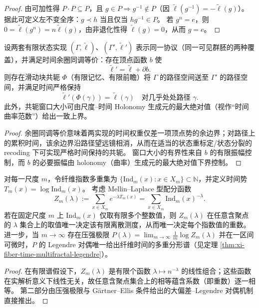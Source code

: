 \begin{proof}
由可加性得 \(P\cdot P\subseteq P\)，且 \(g\in P\Rightarrow g^{-1}\notin P\)（因 \(\widetilde{\ell}(g^{-1})=-\widetilde{\ell}(g)\)）。
据此可定义左不变全序：\(g\prec h\) 当且仅当 \(h g^{-1}\in P\)。
若 \(g^n=e\)，则 \(0=\widetilde{\ell}(g^n)=n\widetilde{\ell}(g)\)，由非退化性得 \(\widetilde{\ell}(g)=0\)，从而 \(g=e\)。
\end{proof}

\begin{theorem}\label{thm:xi-time-conjugacy-rigidity-bounded-class}
设两套有限状态实现 \((\Gamma,\widetilde{\ell})\)、\((\Gamma',\widetilde{\ell}')\) 表示同一协议（同一可见群胚的两种覆盖），并满足时间余圈同调等价：存在顶点函数 \(b\) 使
\[
\widetilde{\ell}'=\widetilde{\ell}+\partial b.
\]
则存在滑动块共轭 \(\Phi\)（有限记忆、有限前瞻）将 \(\Gamma\) 的路径空间送至 \(\Gamma'\) 的路径空间，并满足时间严格保持
\[
\widetilde{\ell}'(\Phi(\gamma))=\widetilde{\ell}(\gamma)
\quad\text{对几乎处处路径 \(\gamma\)}.
\]
此外，共轭窗口大小可由尺度--时间 Holonomy 生成元的最大绝对值（视作“时间曲率范数”）给出一致上界。
\end{theorem}

\begin{proof}
余圈同调等价意味着两实现的时间权重仅差一项顶点势的余边界；对路径上的累积时间，该余边界沿路径望远镜相消，从而在适当的状态重标定/状态分裂的 recoding 下可实现严格时间保持的共轭。
窗口大小的有界性来自 \(b\) 的有限振幅控制，而 \(b\) 的必要振幅由 holonomy（曲率）生成元的最大绝对值下界控制。
\end{proof}

\begin{proposition}\label{prop:xi-time-partition-identifiability-ind-multiset}
对每一尺度 \(m\)，令纤维指数多重集为 \(\{\mathrm{Ind}_m(x):x\in X_m\}\subset\mathbb N\)，并定义时间势 \(T_m(x)=\log \mathrm{Ind}_m(x)\)。
考虑 Mellin--Laplace 型配分函数
\[
Z_m(\lambda):=\sum_{x\in X_m} e^{-\lambda T_m(x)}=\sum_{x\in X_m}\mathrm{Ind}_m(x)^{-\lambda}.
\]
若在固定尺度 \(m\) 上 \(\mathrm{Ind}_m(x)\) 仅取有限多个整数值，则 \(Z_m(\lambda)\) 在任意含聚点的 \(\lambda\) 集合上的取值唯一决定该有限离散测度，从而唯一决定每个指数值的重数。
进一步，当 \(m\to\infty\) 存在压强极限
\(
P(\lambda)=\lim_{m\to\infty}\frac{1}{m}\log Z_m(\lambda)
\)
并在一区间可微时，\(P\) 的 Legendre 对偶唯一给出纤维时间的多重分形谱（见定理 \ref{thm:xi-fiber-time-multifractal-legendre}）。
\end{proposition}

\begin{proof}
在有限谱假设下，\(Z_m(\lambda)\) 是有限个函数 \(\lambda\mapsto n^{-\lambda}\) 的线性组合；这些函数在实解析意义下线性无关，故任意含聚点集合上的相等蕴含系数（即重数）逐一相等。
第二部分由压强极限与 G\"artner--Ellis 条件给出的大偏差--Legendre 对偶机制直接推出。
\end{proof}
